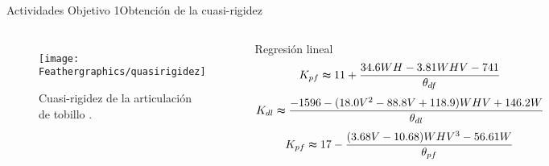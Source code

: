 \documentclass[10pt]{beamer}
\begin{document}
\begin{frame}{Actividades Objetivo 1}{Obtención de la cuasi-rigidez}
\begin{columns}[t]
\column{60 mm}
\begin{figure}
\begin{center}
\texttt{[image: Feathergraphics/quasirigidez]}
\caption{Cuasi-rigidez de la articulación de tobillo \cite{Shamaei2013}.}
\end{center}
\end{figure}

\column{55 mm}
\vspace{10 mm}
\begin{block}{\scriptsize {Regresión lineal}}
\begin{equation}
\scriptsize {K_{pf}\thickapprox 11+\frac{34.6WH-3.81WHV-741}{\theta_{df}}}
\end{equation}
\begin{equation}
\tiny {K_{dl}\thickapprox \frac{-1596-(18.0V^{2}-88.8V+118.9)WHV+146.2W}{\theta_{dl}}}
\end{equation}
\begin{equation}
\scriptsize {K_{pf}\thickapprox 17-\frac{(3.68V-10.68)WHV^{3}-56.61W}{\theta_{pf}}}
\end{equation}
\end{block}


\end{columns}

\end{frame}
\end{document}
